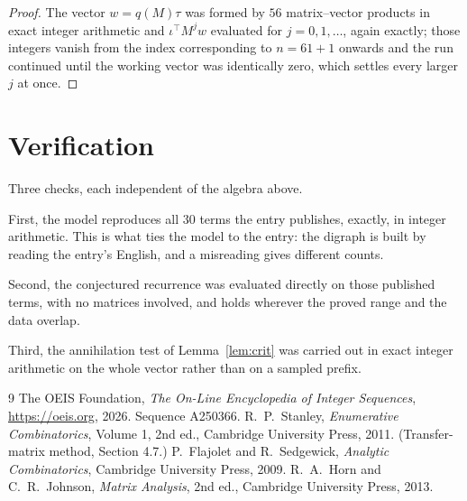 \documentclass[11pt,a4paper]{article}
\theoremstyle{plain}
\theoremstyle{definition}
\begin{document}
\begin{proof}
The vector $w=q(M)\tau$ was formed by $56$ matrix--vector products in exact integer
arithmetic and $\iota^{\!\top}M^{j}w$ evaluated for $j=0,1,\dots$, again exactly; those
integers vanish from the index corresponding to $n=61+1$ onwards and the run continued
until the working vector was identically zero, which settles every larger $j$ at once.
\end{proof}

\section{Verification}

Three checks, each independent of the algebra above.

First, the model reproduces all $30$ terms the entry publishes, exactly, in integer
arithmetic. This is what ties the model to the entry: the digraph is built by reading the
entry's English, and a misreading gives different counts.

Second, the conjectured recurrence was evaluated directly on those published terms, with no
matrices involved, and holds wherever the proved range and the data overlap.

Third, the annihilation test of Lemma~\ref{lem:crit} was carried out in exact integer
arithmetic on the whole vector rather than on a sampled prefix.

\begin{thebibliography}{9}
 The OEIS Foundation, \emph{The On-Line Encyclopedia of Integer
Sequences}, \url{https://oeis.org}, 2026. Sequence A250366.
 R.~P.~Stanley, \emph{Enumerative Combinatorics}, Volume 1, 2nd ed.,
Cambridge University Press, 2011. (Transfer-matrix method, Section 4.7.)
 P.~Flajolet and R.~Sedgewick, \emph{Analytic Combinatorics}, Cambridge
University Press, 2009.
 R.~A.~Horn and C.~R.~Johnson, \emph{Matrix Analysis}, 2nd ed., Cambridge
University Press, 2013.
\end{thebibliography}
\end{document}
